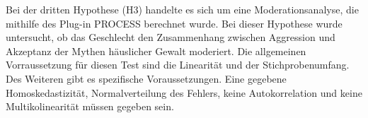 Bei der dritten Hypothese (H3) handelte es sich um eine Moderationsanalyse, die mithilfe des Plug-in PROCESS\textsuperscript{\textregistered} berechnet wurde. Bei dieser Hypothese wurde untersucht, ob das Geschlecht den Zusammenhang zwischen Aggression und Akzeptanz der Mythen häuslicher Gewalt moderiert. Die allgemeinen Vorraussetzung für diesen Test sind die Linearität und der Stichprobenumfang. Des Weiteren gibt es spezifische Voraussetzungen. Eine gegebene Homoskedastizität, Normalverteilung des Fehlers, keine Autokorrelation und keine Multikolinearität müssen gegeben sein. 